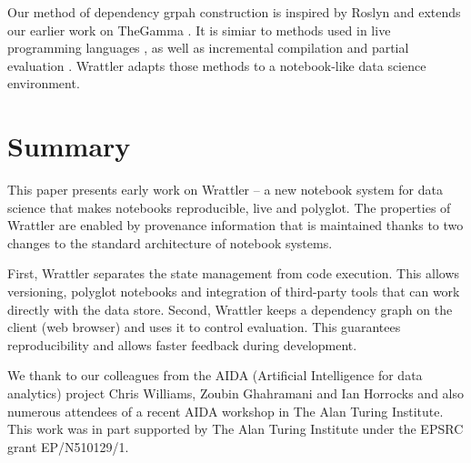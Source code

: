 \documentclass[sigplan]{acmart}\settopmatter{printfolios=true,printccs=false,printacmref=false}
\begin{document}
Our method of dependency grpah construction is inspired by Roslyn \cite{roslyn} and extends our
earlier work on TheGamma \cite{thegamma}. It is simiar to methods used in live programming 
languages \cite{live,subtext}, as well as incremental compilation \cite{incremental} and
partial evaluation \cite{partial}. Wrattler adapts those methods to a notebook-like data
science environment. 

\section{Summary}

This paper presents early work on Wrattler -- a new notebook system for data science that makes
notebooks reproducible, live and polyglot. The properties of Wrattler are enabled by provenance
information that is maintained thanks to two changes to the standard architecture of notebook 
systems. 

First, Wrattler separates the state management from code execution. This allows versioning,
polyglot notebooks and integration of third-party tools that can work directly with
the data store. Second, Wrattler keeps a dependency graph on the client (web browser) and uses 
it to control evaluation. This guarantees reproducibility and allows faster feedback during
development.

\begin{acks}
We thank to our colleagues from the AIDA (Artificial Intelligence for data analytics) project
Chris Williams, Zoubin Ghahramani and Ian Horrocks and also numerous attendees of a recent 
AIDA workshop in The Alan Turing Institute. This work was in part supported by The Alan Turing 
Institute under the EPSRC grant EP/N510129/1.
\end{acks}


\end{document}
